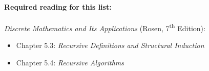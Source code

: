 






\crossline

\paragraph{Required reading for this list:}
\emph{Discrete Mathematics and Its Applications} (Rosen, 7\textsuperscript{th} Edition):
\begin{itemize}
\item Chapter 5.3: \emph{Recursive Definitions and Structural Induction}
\item Chapter 5.4: \emph{Recursive Algorithms}
\end{itemize}

\noteondifficultylevel

\crossline

